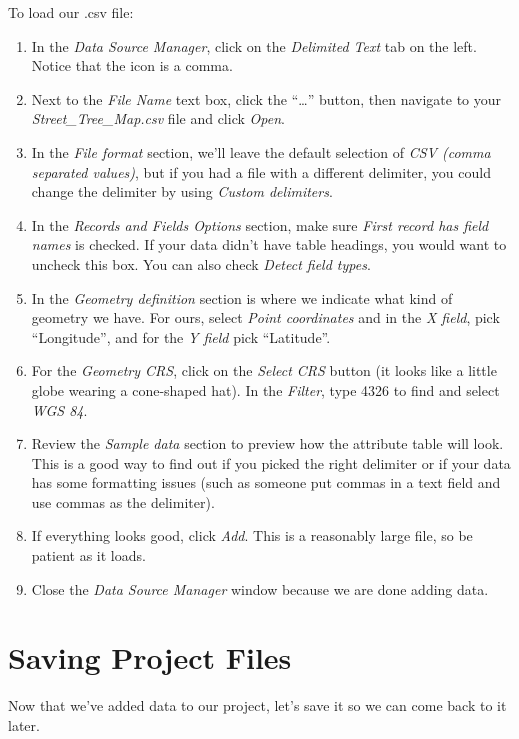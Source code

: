 \documentclass[
]{article}
\providecommand{\tightlist}{%
  \setlength{\itemsep}{0pt}\setlength{\parskip}{0pt}}
\begin{document}
To load our .csv file:

\begin{enumerate}
\def\labelenumi{\arabic{enumi}.}
\tightlist
\item
  In the \emph{Data Source Manager}, click on the \emph{Delimited Text} tab on the left. Notice that the icon is a comma.
\item
  Next to the \emph{File Name} text box, click the ``\ldots{}'' button, then navigate to your \emph{Street\_Tree\_Map.csv} file and click \emph{Open}.
\item
  In the \emph{File format} section, we'll leave the default selection of \emph{CSV (comma separated values)}, but if you had a file with a different delimiter, you could change the delimiter by using \emph{Custom delimiters}.
\item
  In the \emph{Records and Fields Options} section, make sure \emph{First record has field names} is checked. If your data didn't have table headings, you would want to uncheck this box. You can also check \emph{Detect field types}.
\item
  In the \emph{Geometry definition} section is where we indicate what kind of geometry we have. For ours, select \emph{Point coordinates} and in the \emph{X field}, pick ``Longitude'', and for the \emph{Y field} pick ``Latitude''.
\item
  For the \emph{Geometry CRS}, click on the \emph{Select CRS} button (it looks like a little globe wearing a cone-shaped hat). In the \emph{Filter}, type 4326 to find and select \emph{WGS 84}.
\item
  Review the \emph{Sample data} section to preview how the attribute table will look. This is a good way to find out if you picked the right delimiter or if your data has some formatting issues (such as someone put commas in a text field and use commas as the delimiter).
\item
  If everything looks good, click \emph{Add}. This is a reasonably large file, so be patient as it loads.
\item
  Close the \emph{Data Source Manager} window because we are done adding data.
\end{enumerate}

\hypertarget{saving-project-files}{%
\section{Saving Project Files}\label{saving-project-files}}

Now that we've added data to our project, let's save it so we can come back to it later.
\end{document}
